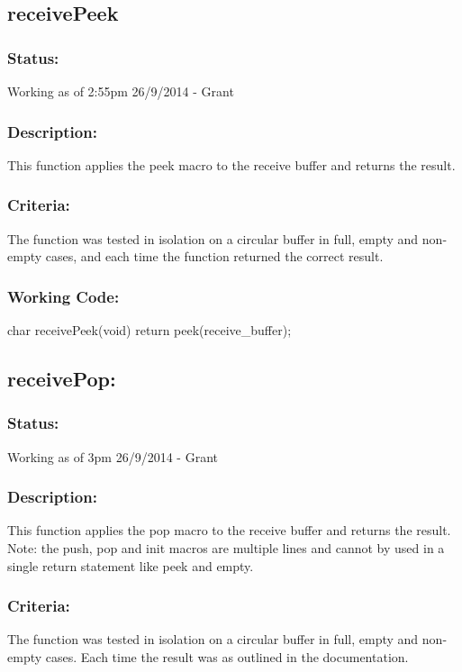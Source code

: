 \documentclass[]{article}
\begin{document}
\subsection{receivePeek}
\subsubsection{Status:}
Working as of 2:55pm 26/9/2014 - Grant

\subsubsection{Description:}
This function applies the peek macro to the receive buffer and returns the result.

\subsubsection{Criteria:}
The function was tested in isolation on a circular buffer in full, empty and non-empty cases, and each time the function returned the correct result.

\subsubsection{Working Code:}
char receivePeek(void)
{
	return peek(receive\_buffer);
}

\subsection{receivePop:}
\subsubsection{Status:}
Working as of 3pm 26/9/2014 - Grant

\subsubsection{Description:}
This function applies the pop macro to the receive buffer and returns the result. Note: the push, pop and init macros are multiple lines and cannot by used in a single return statement like peek and empty.

\subsubsection{Criteria:}
The function was tested in isolation on a circular buffer in full, empty and non-empty cases. Each time the result was as outlined in the documentation.
\end{document}
